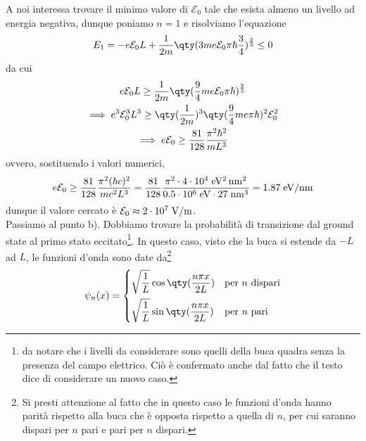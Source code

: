 \begin{soluzione}
   A noi interessa trovare il minimo valore di $\mathcal{E}_0$ tale che esista almeno un livello ad energia negativa, dunque poniamo $n=1$ e risolviamo l'equazione
   \begin{equation*}
      E_1
      =- e \mathcal{E}_0 L + \frac{1}{2m} \qty( 3 m e \mathcal{E}_0 \pi \hbar \frac{3}{4} )^{\frac{2}{3}}
      \leq 0
   \end{equation*}
   da cui
   \begin{gather*}
      e \mathcal{E}_0 L
      \geq \frac{1}{2m} \qty( \frac{9}{4} m e \mathcal{E}_0 \pi \hbar )^{\frac{2}{3}}
      \\
      \implies
      e^3 \mathcal{E}_0^3 L^3
      \geq \qty( \frac{1}{2m} )^3 \qty( \frac{9}{4} m e \pi \hbar )^{2} \mathcal{E}_0^2
      \\
      \implies
      e \mathcal{E}_0
      \geq \frac{81}{128} \frac{\pi^2 \hbar^2}{m L^3}
   \end{gather*}
   ovvero, sostituendo i valori numerici,
   \begin{equation*}
      e \mathcal{E}_0
      \geq \frac{81}{128} \frac{\pi^2 (\hbar c)^2}{m c^2 L^3}
      =\frac{81}{128} \frac{\pi^2 \cdot 4 \cdot 10^4 \; \rm eV^2 \, \rm nm^2}{0.5 \cdot 10^6 \; \rm eV \cdot 27 \; \rm nm^3}
      = 1.87 \; \rm eV/\rm nm
   \end{equation*}
   dunque il valore cercato è $\mathcal{E}_0 \approx 2 \cdot 10^7 \; \rm V/m$.\\
   Passiamo al punto b). Dobbiamo trovare la probabilità di transizione dal ground state al primo stato eccitato\footnote{\E da notare che i livelli da considerare sono quelli della buca quadra senza la presenza del campo elettrico. Ciò è confermato anche dal fatto che il testo dice di considerare un nuovo caso.}. In questo caso, visto che la buca si estende da $-L$ ad $L$, le funzioni d'onda sono date da\footnote{Si presti attenzione al fatto che in questo caso le funzioni d'onda hanno parità rispetto alla buca che è opposta rispetto a quella di $n$, per cui saranno dispari per $n$ pari e pari per $n$ dispari.}
   \begin{equation*}
      \psi_n(x)
      =
      \begin{cases}
         \displaystyle \sqrt{\frac{1}{L}}\cos{ \qty( \frac{n \pi x}{2L} ) } & \text{per $n$ dispari}\\[0.3cm]
         \displaystyle \sqrt{\frac{1}{L}}\sin{ \qty( \frac{n \pi x}{2L} ) } & \text{per $n$ pari}
      \end{cases}
   \end{equation*}

\end{soluzione}
